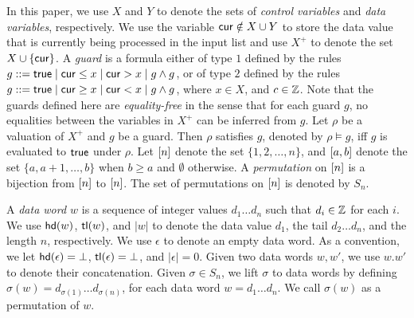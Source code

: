 In this paper, we use $X$ and $Y$ to denote the sets of \emph{control variables} and \emph{data variables}, respectively. We use the variable $\mathsf{cur} \notin X\cup Y$ to store the data value that is currently being processed in the input list and use $X^+$ to denote the set $X\cup \{\mathsf{cur}\}$.
A \emph{guard} is a formula either of type $1$ defined by the rules $g::= \mathsf{true} \mid \mathsf{cur} \le x \mid \mathsf{cur} > x \mid g \wedge g$, or of type $2$ defined by the rules $g::= \mathsf{true} \mid \mathsf{cur} \ge x \mid \mathsf{cur} < x \mid g \wedge g$, where $x \in X$, and $c\in {\mathbb{Z} }$. Note that the guards defined here are \emph{equality-free} in the sense that for each guard $g$, no equalities between the variables in $X^+$ can be inferred from $g$.
Let $\rho$ be a valuation of $X^+$ and $g$ be a guard. Then $\rho$ satisfies $g$, denoted by $\rho \models g$, iff $g$ is evaluated to $\mathsf{true}$ under $\rho$. 
Let $[n]$ denote the set $\{ 1, 2, \dots, n \}$, and $[a,b]$ denote the set $\{ a, a+1, \dots, b \}$ when $b\geq a$ and $\emptyset$ otherwise. A \emph{permutation} on
$[n]$ is a bijection from $[n]$ to
$[n]$. The set of
permutations on $[n]$ is denoted by $S_n$.

A \emph{data word $w$} is a sequence of integer values $d_1\dots d_n$ such that $d_i \in {\mathbb{Z} }$ for each $i$.
We use $\mathsf{hd}(w)$, $\mathsf{tl}(w)$, and $|w|$ to denote the data value $d_1$, the tail $d_2\dots d_n$, and the length $n$, respectively.
We use $\epsilon$ to denote an empty data word. As a convention, we let $\mathsf{hd}(\epsilon)=\bot$, $\mathsf{tl}(\epsilon)=\bot$, and $|\epsilon|=0$.
Given two data words $w,w'$, we use $w.w'$ to denote their concatenation.
Given $\sigma \in S_n$, we lift $\sigma$ to data words by defining $\sigma(w)=d_{\sigma(1)} \dots d_{\sigma(n)}$, for each data word $w=d_1\dots d_n$. We call $\sigma(w)$ as a permutation of $w$.